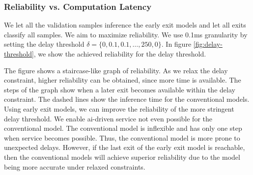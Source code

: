 \subsubsection{Reliability vs. Computation Latency}

We let all the validation samples inference the early exit models and let all exits classify all samples.  We aim to maximize reliability. We use 0.1ms granularity by setting the delay threshold $\delta = \{0,0.1,0.1, \dots, 250,0\}$. In figure \ref{fig:delay-threshold}, we show the achieved reliability for the delay threshold. 

The figure shows a staircase-like graph of reliability. As we relax the delay constraint, higher reliability can be obtained, since more time is available. The steps of the graph show when a later exit becomes available within the delay constraint. The dashed lines show the inference time for the conventional models. Using early exit models, we can improve the reliability of the more stringent delay threshold. We enable \gls{ai}-driven service not even possible for the conventional model. The conventional model is inflexible and has only one step when service becomes possible. Thus, the conventional model is more prone to unexpected delays. However, if the last exit of the early exit model is reachable, then the conventional models will achieve superior reliability due to the model being more accurate under relaxed constraints.

